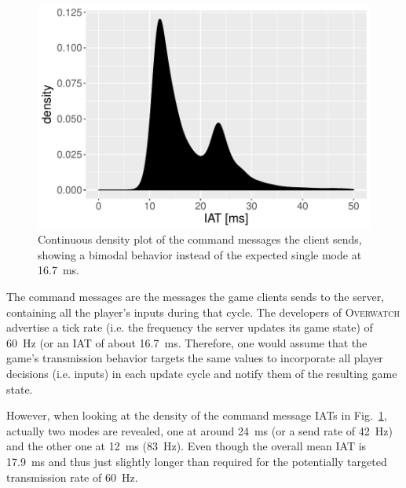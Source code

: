 \begin{figure}[t]
	\centering
	\includegraphics[width=1.0\columnwidth]{images/command-density.pdf}
	\caption{Continuous density plot of the command messages the client sends, showing a bimodal behavior instead of the expected single mode at \SI{16.7}{\milli\second}.}
\label{fig:command-density}
\end{figure}

The command messages are the messages the game clients sends to the server, containing all the player's inputs during that cycle. The developers of \textsc{Overwatch} advertise a tick rate (i.e. the frequency the server updates its game state) of \SI{60}{\hertz} (or an \gls{IAT} of about \SI{16.7}{\milli\second}. Therefore, one would assume that the game's transmission behavior targets the same values to incorporate all player decisions (i.e. inputs) in each update cycle and notify them of the resulting game state.

However, when looking at the density of the command message \glspl{IAT} in Fig.~\ref{fig:command-density}, actually two modes are revealed, one at around \SI{24}{\milli\second} (or a send rate of \SI{42}{\hertz}) and the other one at \SI{12}{\milli\second} (\SI{83}{\hertz}). Even though the overall mean \gls{IAT} is \SI{17.9}{\milli\second} and thus just slightly longer than required for the potentially targeted transmission rate of \SI{60}{\hertz}.

